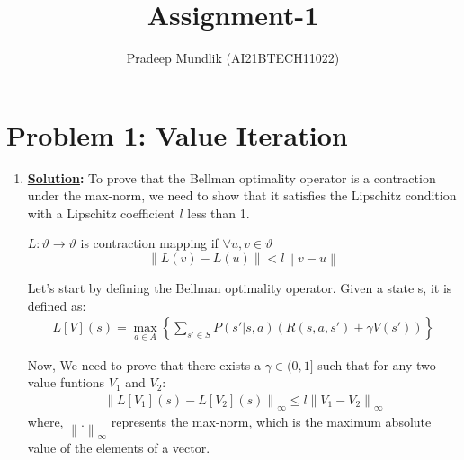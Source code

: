 \documentclass[12pt]{article}
\title{Assignment-1}
\author{Pradeep Mundlik (AI21BTECH11022)}
\newcommand{\solution}{\noindent \textbf{\underline{Solution}: }}
\begin{document}
\maketitle

\section*{Problem 1: Value Iteration}

\begin{enumerate}
    \item \solution
    To prove that the Bellman optimality operator is a contraction under the max-norm, 
    we need to show that it satisfies the Lipschitz condition with a Lipschitz coefficient $l$ less than 1. 

    $L: \vartheta \to \vartheta$ is contraction mapping if $ \forall u, v \in \vartheta$
    \begin{equation*}
        \left\lVert L(v) - L(u)\right\rVert < l \left\lVert v-u\right\rVert
    \end{equation*}

    Let's start by defining the Bellman optimality operator. Given a state s, it is defined as:
    \begin{align*}
        L[V](s) = \max_{a \in A} \left\{ \sum_{s' \in S} P(s' | s, a) \left( R(s, a, s') + \gamma V(s') \right) \right\}
    \end{align*}

    Now, We need to prove that there exists a $\gamma \in (0,1]$ such that for any two value funtions
    $V_1$ and $V_2$:
    \begin{align*}
        \left\lVert L[V_1](s) - L[V_2](s)\right\rVert _\infty \leq l \left\lVert V_1 - V_2 \right\rVert _\infty
    \end{align*}
    where, $ \left\lVert . \right\rVert _\infty $ represents the max-norm, which is the maximum absolute value of the elements of a vector.


\end{enumerate}
\end{document}
